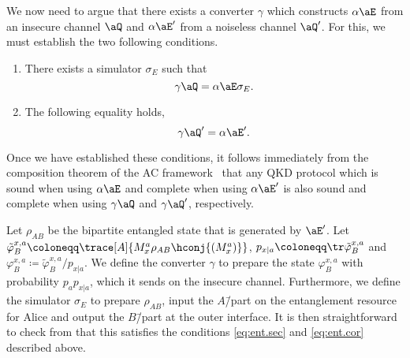 We now need to argue that there exists a converter $\gamma$ which constructs
$\alpha \aE$ from an insecure channel $\aQ$ and $\alpha \aE'$ from a
noiseless channel $\aQ'$. For this, we must
establish the two following conditions.
\begin{enumerate}[label=(\roman*), ref=\roman*]
\item \label{eq:ent.sec} There exists a simulator $\sigma_E$ such that
  \[ 
   \gamma \aQ = \alpha \aE \sigma_E.
\]
\item \label{eq:ent.cor} The following equality holds,
  \[\gamma \aQ' = \alpha \aE'.\] 
\end{enumerate}
Once we have established these conditions, it follows immediately from
the composition theorem of the AC framework~\cite{MR11} that any QKD
protocol which is sound when using $\alpha\aE$ and complete when using
$\alpha\aE'$ is also sound and complete when using $\gamma\aQ$ and
$\gamma\aQ'$, respectively.

Let $\rho_{AB}$ be the bipartite entangled state that is generated by
$\aE'$. Let
$\tilde{\varphi}^{x,a}_B \coloneqq \trace[A]{M^a_x \rho_{AB}
  \hconj{\left(M^a_x\right)}}$,
$p_{x|a} \coloneqq \tr \tilde{\varphi}^{x,a}_B$ and
$\varphi^{x,a}_B \coloneqq \tilde{\varphi}^{x,a}_B/p_{x|a}$. We define
the converter $\gamma$ to prepare the state $\varphi^{x,a}_B$ with
probability $p_ap_{x|a}$, which it sends on the insecure
channel. Furthermore, we define the simulator $\sigma_E$ to prepare
$\rho_{AB}$, input the $A$\=/part on the entanglement resource for
Alice and output the $B$\=/part at the outer interface. It is then
straightforward to check from  that this satisfies
the conditions \eqref{eq:ent.sec} and \eqref{eq:ent.cor} described above.


